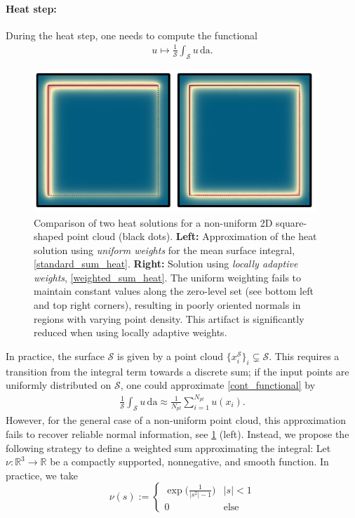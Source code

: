 \documentclass[12pt,openany]{book}
\newcommand{\R}{\mathbb{R}}
\def\S{\mathcal{S}}
\theoremstyle{plainnormal}
\theoremstyle{remark}
\begin{document}
\paragraph{Heat step:}
During the heat step, one needs to compute the functional 
\begin{align} \label{cont_functional}
    u \mapsto \frac{1}{\S}\int_\S u\, \mathrm{da}.
\end{align} 
\begin{figure}[!t]
    \centering
    \includegraphics[width=0.95\textwidth]{Figures/2D_combined2.pdf}
    \caption{ Comparison of two heat solutions for a non-uniform 2D square-shaped point cloud (black dots). \textbf{Left:} Approximation of the heat solution using \emph{uniform weights} for the mean surface integral, \cref{standard_sum_heat}. \textbf{Right:} Solution using \emph{locally adaptive weights}, \cref{weighted_sum_heat}. The uniform weighting fails to maintain constant values along the zero-level set (see bottom left and top right corners), resulting in poorly oriented normals in regions with varying point density. This artifact is significantly reduced when using locally adaptive weights.}
    
\label{heatweights}
\end{figure}In practice, the surface $\S$ is given by a point cloud $\{x_i^\S\}_i\subsetneq\mathcal S$. This requires a transition from the integral term towards a discrete sum; if the input points are  uniformly distributed on $\S$, one could approximate
\cref{cont_functional} by \begin{align}\label{standard_sum_heat}
    \frac{1}{\S}\int_\S u\,\mathrm{da}\approx \frac{1}{N_{pt}}\sum_{i = 1}^{N_{pt}} u(x_i).
\end{align}
However, for the general case of a non-uniform point cloud, this approximation fails to recover reliable normal information, see \cref{heatweights} (left). Instead, we propose the following strategy to define a weighted sum approximating the integral: Let $\nu:\R^3 \rightarrow\R$ be a compactly supported, nonnegative, and smooth function. In practice, we take $$\nu(s) := \begin{cases}
    \exp\Big(\frac{1}{|s^2| - 1}\Big) &|s|<1\\
    0  &\text{else}
\end{cases}$$
\end{document}
